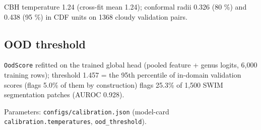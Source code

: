CBH temperature 1.24 (cross-fit mean 1.24); conformal radii 0.326 (80 \%) and 0.438 (95 \%) in CDF units on 1368 cloudy validation pairs.

\subsection{OOD threshold}

\texttt{OodScore} refitted on the trained global head (pooled feature + genus logits, 6,000 training rows); threshold 1.457 = the 95th percentile of in-domain validation scores (flags 5.0\% of them by construction) flags 25.3\% of 1,500 SWIM segmentation patches (AUROC 0.928).

Parameters: \texttt{configs/calibration.json} (model-card \texttt{calibration.temperatures}, \texttt{ood\_\allowbreak{}threshold}).

